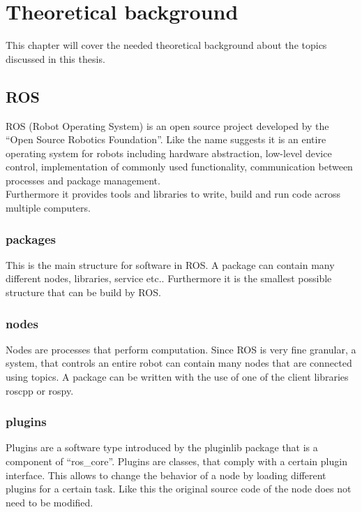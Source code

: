 \chapter{Theoretical background}
\label{theoretical_background}
This chapter will cover the needed theoretical background about the topics discussed in this thesis.
\section{ROS}
ROS (Robot Operating System) is an open source project developed by the ``Open Source Robotics Foundation''. Like the name suggests it is an entire operating system for robots including hardware abstraction, low-level device control, implementation of commonly used functionality, communication between processes and package management.\\
Furthermore it provides tools and libraries to write, build and run code across multiple computers\cite{rosintro}.\\

\subsection{packages}
This is the main structure for software in ROS. A package can contain many different nodes, libraries, service etc.. Furthermore it is the smallest possible structure that can be build by ROS\cite{rosconcepts}.
\subsection{nodes}
Nodes are processes that perform computation. Since ROS is very fine granular, a system, that controls an entire robot can contain many nodes that are connected using topics. A package can be written with the use of one of the client libraries roscpp or rospy\cite{rosconcepts}.
\subsection{plugins}

Plugins are a software type introduced by the pluginlib package that is a component of ``ros\_core''. Plugins are classes, that comply with a certain plugin interface. This allows to change the behavior of a node by loading different plugins for a certain task. Like this the original source code of the node does not need to be modified\cite{pluginlib}.

